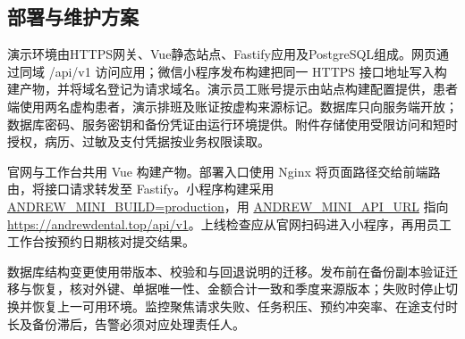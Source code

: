 \documentclass[UTF8,12pt,a4paper,fontset=none]{ctexart}
\begin{document}
\subsection{部署与维护方案}
演示环境由HTTPS网关、Vue静态站点、Fastify应用及PostgreSQL组成。网页通过同域 {/api/v1} 访问应用；微信小程序发布构建把同一 HTTPS 接口地址写入构建产物，并将域名登记为请求域名。演示员工账号提示由站点构建配置提供，患者端使用两名虚构患者，演示排班及账证按虚构来源标记。数据库只向服务端开放；数据库密码、服务密钥和备份凭证由运行环境提供。附件存储使用受限访问和短时授权，病历、过敏及支付凭据按业务权限读取。\par
官网与工作台共用 Vue 构建产物。部署入口使用 Nginx 将页面路径交给前端路由，将接口请求转发至 Fastify。小程序构建采用 \url{ANDREW_MINI_BUILD=production}，用 \url{ANDREW_MINI_API_URL} 指向 \url{https://andrewdental.top/api/v1}。上线检查应从官网扫码进入小程序，再用员工工作台按预约日期核对提交结果。\par
数据库结构变更使用带版本、校验和与回退说明的迁移。发布前在备份副本验证迁移与恢复，核对外键、单据唯一性、金额合计一致和季度来源版本；失败时停止切换并恢复上一可用环境。监控聚焦请求失败、任务积压、预约冲突率、在途支付时长及备份滞后，告警必须对应处理责任人。\par

\Needspace{459pt}
\end{document}
